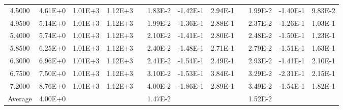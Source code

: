 \begin{center}
\begin{table}[h]
\begin{tabular}{cccccccccccc}
    4.5000 &   4.61E+0 &   1.01E+3 &   1.12E+3 &  &   1.83E-2 &  -1.42E-1 &   2.94E-1 &  &   1.99E-2 &  -1.40E-1 &   9.83E-2 \\
    4.9500 &   5.14E+0 &   1.01E+3 &   1.12E+3 &  &   1.99E-2 &  -1.36E-1 &   2.88E-1 &  &   2.37E-2 &  -1.26E-1 &   1.03E-1 \\
    5.4000 &   5.74E+0 &   1.01E+3 &   1.12E+3 &  &   2.10E-2 &  -1.41E-1 &   2.80E-1 &  &   2.48E-2 &  -1.50E-1 &   1.23E-1 \\
    5.8500 &   6.25E+0 &   1.01E+3 &   1.12E+3 &  &   2.40E-2 &  -1.48E-1 &   2.71E-1 &  &   2.79E-2 &  -1.51E-1 &   1.63E-1 \\
    6.3000 &   6.96E+0 &   1.01E+3 &   1.12E+3 &  &   2.41E-2 &  -1.54E-1 &   2.49E-1 &  &   2.93E-2 &  -1.41E-1 &   2.10E-1 \\
    6.7500 &   7.50E+0 &   1.01E+3 &   1.12E+3 &  &   3.10E-2 &  -1.53E-1 &   3.84E-1 &  &   3.29E-2 &  -2.31E-1 &   2.15E-1 \\
    7.2000 &   8.76E+0 &   1.01E+3 &   1.12E+3 &  &   4.00E-2 &  -1.86E-1 &   2.89E-1 &  &   3.49E-2 &  -1.54E-1 &   1.82E-1 \\
 \hline
Average &  4.00E+0& & & &  1.47E-2& & & &  1.52E-2\\
  \hline
 \end{tabular}
 \label{tab:ANH-E-1SOR5-error}
 \end{table}
\end{center}
\cp
